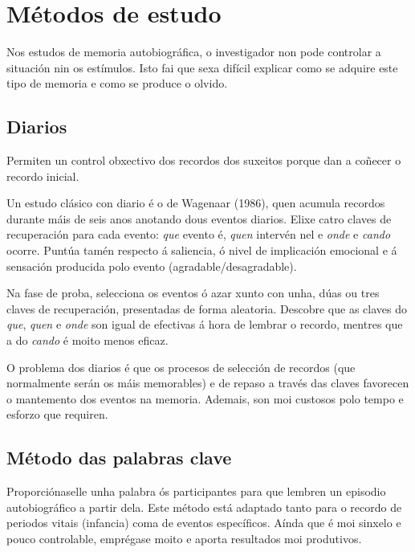 \documentclass[a4paper,11pt]{article}
\begin{document}
\section{Métodos de estudo}
Nos estudos de memoria autobiográfica, o investigador non pode controlar a situación nin os estímulos. Isto fai que sexa difícil explicar como se adquire este tipo de memoria e como se produce o olvido. 

\subsection{Diarios}
Permiten un control obxectivo dos recordos dos suxeitos porque dan a coñecer o recordo inicial. 

Un estudo clásico con diario é o de Wagenaar (1986), quen acumula recordos durante máis de seis anos anotando dous eventos diarios. Elixe catro claves de recuperación para cada evento: \textit{que} evento é, \textit{quen} intervén nel e \textit{onde} e \textit{cando} ocorre. Puntúa tamén respecto á saliencia, ó nivel de implicación emocional e á sensación producida polo evento (agradable/desagradable).

Na fase de proba, selecciona os eventos ó azar xunto con unha, dúas ou tres claves de recuperación, presentadas de forma aleatoria. Descobre que as claves do \textit{que}, \textit{quen} e \textit{onde} son igual de efectivas á hora de lembrar o recordo, mentres que a do \textit{cando} é moito menos eficaz. 

O problema dos diarios é que os procesos de selección de recordos (que normalmente serán os máis memorables) e de repaso a través das claves favorecen o mantemento dos eventos na memoria. Ademais, son moi custosos polo tempo e esforzo que requiren.

\subsection{Método das palabras clave}
Proporciónaselle unha palabra ós participantes para que lembren un episodio autobiográfico a partir dela. Este método está adaptado tanto para o recordo de periodos vitais (infancia) coma de eventos específicos. Aínda que é moi sinxelo e pouco controlable, emprégase moito e aporta resultados moi produtivos.
\end{document}
